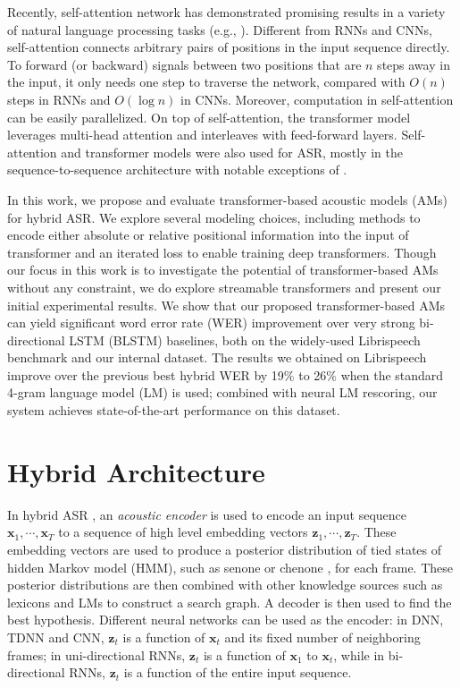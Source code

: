 \documentclass{article}
\begin{document}
Recently, self-attention network \cite{vaswani2017attention} has demonstrated promising results in a variety of natural language processing tasks (e.g., \cite{vaswani2017attention, devlin2018bert, radford2018improving}). Different from RNNs and CNNs, self-attention connects arbitrary pairs of positions in the input sequence directly. To forward (or backward) signals between two positions that are $n$ steps away in the input, it only needs one step to traverse the network, compared with $O(n)$ steps in RNNs and $O(\log n)$ in CNNs. Moreover, computation in self-attention can be easily parallelized.  On top of self-attention, the transformer model \cite{vaswani2017attention} leverages multi-head attention and interleaves with feed-forward layers. Self-attention and transformer models were also used for ASR, mostly in the sequence-to-sequence architecture \cite{dong2018speech, sperber2018self,zhou2018syllable} with notable exceptions of \cite{povey2018time, salazar2019self}. 

In this work, we propose and evaluate transformer-based acoustic models (AMs) for hybrid ASR. We explore several modeling choices, including methods to encode either absolute or relative positional information into the input of transformer and an iterated loss to enable training deep transformers. Though our focus in this work is to investigate the potential of transformer-based AMs without any constraint, we do explore streamable transformers and present our initial experimental results. We show that our proposed transformer-based AMs can yield significant word error rate (WER) improvement over very strong bi-directional LSTM (BLSTM) baselines, both on the widely-used Librispeech benchmark and our internal dataset. The results we obtained on Librispeech improve over the previous best hybrid WER by 19\% to 26\% when the standard 4-gram language model (LM) is used; combined with neural LM rescoring, our system achieves state-of-the-art performance on this dataset.





\section{Hybrid  Architecture}
\label{sec:hybrid}
In hybrid ASR \cite{bourlard2012connectionist}, an \emph{acoustic encoder} is used to encode an input sequence $\boldsymbol{x}_1, \cdots, \boldsymbol{x}_T$ to a sequence of high level embedding vectors $\boldsymbol{z}_1, \cdots, \boldsymbol{z}_T$. These embedding vectors are used to produce a posterior distribution of tied states of hidden Markov model (HMM), such as senone \cite{hwang1992subphonetic} or chenone \cite{le2019senones}, for each frame. These posterior distributions are then combined with other knowledge sources such as lexicons and LMs to construct a search graph. A decoder is then used to find the best hypothesis. Different neural networks can be used as the encoder: in DNN, TDNN and CNN, $\boldsymbol{z}_t$ is a function of $\boldsymbol{x}_t$ and its fixed number of neighboring frames; in uni-directional RNNs, $\boldsymbol{z}_t$ is a function of $\boldsymbol{x}_1$ to $\boldsymbol{x}_t$, while in bi-directional RNNs, $\boldsymbol{z}_t$ is a function of the entire input sequence. 
\end{document}
